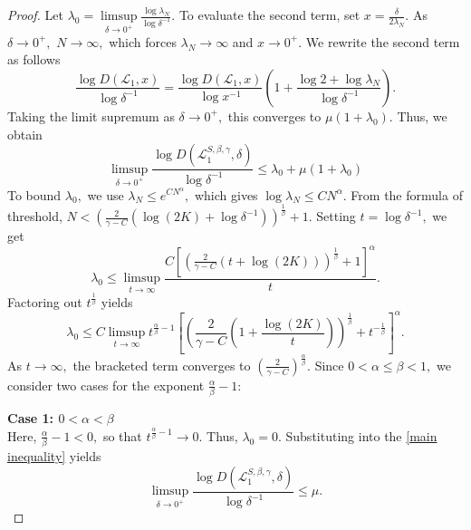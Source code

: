 \documentclass[a4paper,11pt,reqno]{amsart}
\theoremstyle{plain}
\theoremstyle{mainthmstyle}
\theoremstyle{named}
\numberwithin{equation}{section}
\begin{document}
\begin{proof}
Let $\lambda_0 = \limsup\limits_{\delta \to 0^{+}} \frac {\log \lambda_N} {\log \delta^{-1}}.$ To evaluate the second term, set $x = \frac {\delta} {2\lambda_N}.$ As $\delta \to 0^{+},$ $N \to \infty,$ which forces $\lambda_N \to \infty$ and $x \to 0^{+}.$ We rewrite the second term as follows
$$\frac {\log D \left (\mathcal L_1, x \right )} {\log \delta^{-1}} = \frac {\log D \left (\mathcal L_1, x \right )} {\log x^{-1}} \left( 1 + \frac {\log 2 + \log \lambda_N} {\log \delta^{-1}} \right).$$
Taking the limit supremum as $\delta \to 0^{+},$ this converges to $\mu(1 + \lambda_0).$ Thus, we obtain
\begin{equation} \label{main inequality} \limsup\limits_{\delta \to 0^{+}} \frac {\log D \left (\mathcal L_1^{S, \beta, \gamma}, \delta \right )} {\log \delta^{-1}} \leq \lambda_0 + \mu(1 + \lambda_0) \end{equation}
To bound $\lambda_0,$ we use $\lambda_N \leq e^{C N^{\alpha}},$ which gives $\log \lambda_N \leq C N^{\alpha}.$ From the formula of threshold, $N < \left (\frac {2} {\gamma - C} (\log(2K) + \log \delta^{-1}) \right )^{\frac {1} {\beta}} + 1.$ Setting $t = \log \delta^{-1},$ we get
$$\lambda_0 \leq \limsup\limits_{t \to \infty} \frac {C \left[ \left (\frac {2} {\gamma - C} (t + \log(2K)) \right )^{\frac {1} {\beta}} + 1 \right]^{\alpha}} {t}.$$
Factoring out $t^{\frac {1} {\beta}}$ yields
$$\lambda_0 \leq C \limsup\limits_{t \to \infty} t^{\frac {\alpha} {\beta} - 1} \left[ \left (\frac {2} {\gamma - C} \left( 1 + \frac {\log(2K)} {t} \right) \right )^{\frac {1} {\beta}} + t^{-\frac {1} {\beta}} \right]^{\alpha}.$$
As $t \to \infty,$ the bracketed term converges to $\left( \frac {2} {\gamma - C} \right )^{\frac {\alpha} {\beta}}.$ Since $0 < \alpha \leq \beta < 1,$ we consider two cases for the exponent $\frac {\alpha} {\beta} - 1$:

\textbf{Case 1: $0 < \alpha < \beta$} \\
Here, $\frac {\alpha} {\beta} - 1 < 0,$ so that $t^{\frac {\alpha} {\beta} - 1} \to 0.$ Thus, $\lambda_0 = 0.$ Substituting into the \eqref{main inequality} yields
$$\limsup\limits_{\delta \to 0^{+}} \frac {\log D \left (\mathcal L_1^{S, \beta, \gamma}, \delta \right )} {\log \delta^{-1}} \leq \mu.$$


\end{proof}
\end{document}
